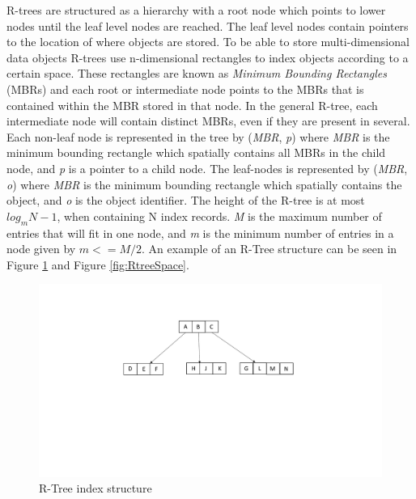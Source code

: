 \noindent
R-trees are structured as a hierarchy with a root node which points to lower nodes until the leaf level nodes are reached. The leaf level nodes contain pointers to the location of where objects are stored. To be able to store multi-dimensional data objects R-trees use n-dimensional rectangles to index objects according to a certain space. These rectangles are known as \emph{Minimum Bounding Rectangles} (MBRs) and each root or intermediate node points to the MBRs that is contained within the MBR stored in that node. In the general R-tree, each intermediate node will contain distinct MBRs, even if they are present in several. Each non-leaf node is represented in the tree by (\emph{MBR},  \emph{p}) where \emph{MBR} is the minimum bounding rectangle which spatially contains all MBRs in the child node, and \emph{p} is a pointer to a child node. The leaf-nodes is represented by (\emph{MBR}, \emph{o}) where \emph{MBR} is the minimum bounding rectangle which spatially contains the object, and \emph{o} is the object identifier. The height of the R-tree is at most \(log_mN-1\), when containing N index records. \emph{M} is the maximum number of entries that will fit in one node, and \emph{m} is the minimum number of entries in a node given by \(m <= M/2\). An example of an R-Tree structure can be seen in Figure \ref{fig:RTree} and Figure \ref{fig:RtreeSpace}.

\begin{figure}[ht]
    \centering
    \includegraphics[scale=0.4]{figures/RTree.pdf}
    \caption{R-Tree index structure}
    \label{fig:RTree}
\end{figure}

